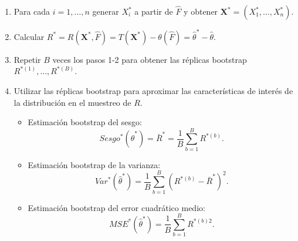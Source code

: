 \documentclass[
  10pt,
]{book}
\renewcommand{\mathbf}[1]{\symbf{#1}}
\theoremstyle{break}
\theoremstyle{nonumberplain}
\begin{document}
\begin{enumerate}
\def\labelenumi{\arabic{enumi}.}
\item
  Para cada \(i=1,\ldots ,n\) generar \(X_i^{\ast}\) a partir de
  \(\hat{F}\) y obtener \(\mathbf{X}^{\ast}=\left( X_1^{\ast}, \ldots ,X_n^{\ast} \right)\).
\item
  Calcular \(R^{\ast}=R\left( \mathbf{X}^{\ast},\hat{F} \right) = T\left( \mathbf{X}^{\ast} \right) -\theta \left( \hat{F} \right) = \hat{\theta}^{\ast} - \hat{\theta}\).
\item
  Repetir \(B\) veces los pasos 1-2 para obtener las réplicas bootstrap
  \(R^{\ast (1)}, \ldots, R^{\ast (B)}\).
\item
  Utilizar las réplicas bootstrap para aproximar las características de interés de la distribución en el muestreo de \(R\).

  \begin{itemize}
  \item
    Estimación bootstrap del sesgo:
    \[Sesgo^{\ast}\left( \hat{\theta}^{\ast} \right) =\bar{R}^{\ast}=\frac{1}{B}\sum_{b=1}^{B}R^{\ast (b)}.\]
  \item
    Estimación bootstrap de la varianza:
    \[Var^{\ast}\left( \hat{\theta}^{\ast} \right) =\frac{1}{B} \sum_{b=1}^{B}\left( R^{\ast (b)}-\bar{R}^{\ast} \right)^2.\]
  \item
    Estimación bootstrap del error cuadrático medio:
    \[MSE^{\ast}\left( \hat{\theta}^{\ast} \right) =\frac{1}{B}\sum_{b=1}^{B}R^{\ast (b) 2}.\]
  \end{itemize}
\end{enumerate}
\end{document}
